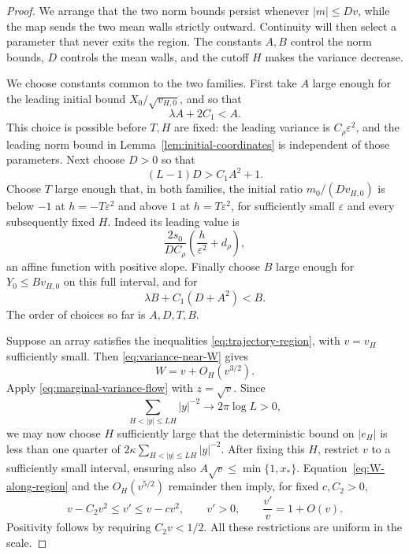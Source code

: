 \begin{proof}
We arrange that the two norm bounds persist whenever \(|m|\le Dv\),
while the map sends the two mean walls strictly outward.  Continuity
will then select a parameter that never exits the region.  The constants
\(A,B\) control the norm bounds, \(D\) controls the mean walls, and
the cutoff \(H\) makes the variance decrease.

We choose constants common to the two families.  First take \(A\)
large enough for the leading initial bound \(X_0/\sqrt{v_{H,0}}\),
and so that
\begin{equation}
 \lambda A+2C_1<A.
 \label{eq:choose-A}
\end{equation}
This choice is possible before \(T,H\) are fixed: the leading variance
is \(C_\rho\varepsilon^2\), and the leading norm bound in
Lemma~\ref{lem:initial-coordinates} is independent of those parameters.
Next choose \(D>0\) so that
\begin{equation}
 (L-1)D>C_1A^2+1.
 \label{eq:choose-D}
\end{equation}
Choose \(T\) large enough that, in both families, the initial ratio
\(m_0/(Dv_{H,0})\) is below \(-1\) at \(h=-T\varepsilon^2\)
and above \(1\) at \(h=T\varepsilon^2\), for sufficiently small
\(\varepsilon\) and every subsequently fixed \(H\).  Indeed its
leading value is
\[
 \frac{2s_0}{DC_\rho}
       \left(\frac h{\varepsilon^2}+d_\rho\right),
\]
an affine function with positive slope.  Finally choose \(B\) large
enough for \(Y_0\le Bv_{H,0}\) on this full interval, and for
\begin{equation}
 \lambda B+C_1(D+A^2)<B.
 \label{eq:choose-B}
\end{equation}
The order of choices so far is \(A,D,T,B\).

Suppose an array satisfies the inequalities
\eqref{eq:trajectory-region}, with \(v=v_H\) sufficiently small.
Then \eqref{eq:variance-near-W} gives
\begin{equation}
 W=v+O_H(v^{3/2}).
 \label{eq:W-along-region}
\end{equation}
Apply \eqref{eq:marginal-variance-flow} with \(z=\sqrt v\).  Since
\[
 \sum_{H<|y|\le LH}|y|^{-2}\longrightarrow2\pi\log L>0,
\]
we may now choose \(H\) sufficiently large that the deterministic bound
on \(|e_H|\) is less than one quarter of
\(2\kappa\sum_{H<|y|\le LH}|y|^{-2}\).  After fixing this \(H\),
restrict \(v\) to a sufficiently
small interval, ensuring also \(A\sqrt v\le\min\{1,x_*\}\).
Equation~\eqref{eq:W-along-region} and the \(O_H(v^{5/2})\) remainder
then imply, for fixed \(c,C_2>0\),
\begin{equation}
 v-C_2v^2\le v'\le v-cv^2,
 \qquad v'>0,\qquad \frac{v'}v=1+O(v).
 \label{eq:variance-trap}
\end{equation}
Positivity follows by requiring \(C_2v<1/2\).  All these restrictions
are uniform in the scale.


\end{proof}
